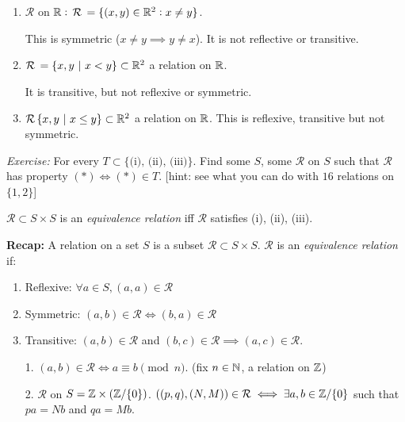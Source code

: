 \documentclass[10pt]{scrartcl}
\newcommand{\rel}{\mathcal{R}}
\begin{document}
\begin{examples}
	\begin{enumerate}
	\item $\rel$ on $\R: \,\rel\, = \{(x,y) \iR^2 : x \neq y\}$.
	
	This is symmetric ($x \neq y \implies y \neq x$). It is not reflective or transitive. 
	\item $\rel\, = \{x,y ~|~ x < y\} \subset \R^2$ a relation on $\mathbb{R}$. 	
	
	It is transitive, but not reflexive or symmetric. 
	
	\item $\rel\, \{x,y ~|~ x \leq y\} \subset \R^2$ a relation on $\mathbb{R}$. This is reflexive, transitive but not symmetric. 
	\end{enumerate}

\end{examples} 


\emph{Exercise:} For every $T \subset \{\text{(i), (ii), (iii)}\}$. Find some $S$, some $\rel$ on $S$ such that $\rel$ has property $(*) \iff (*) \in T$. [hint: see what you can do with $16$ relations on $\{1,2\}$]\\

\begin{definition}
$\rel \subset S \times S$ is an \emph{equivalence relation} iff $\rel$ satisfies (i), (ii), (iii).
\end{definition}

\pagebreak
\textbf{Recap:} A 
relation on a set $S$ is a subset $\rel \subset S\times S$. $\rel$ is an \emph{equivalence relation} if: 
\begin{enumerate}
\item Reflexive: $\forall a \in S, (a,a) \in \rel$
\item Symmetric: $(a,b) \in \rel \iff (b,a) \in \rel$
\item Transitive: $(a,b) \in \rel$ and $(b,c) \in \rel \implies (a,c) \in \rel$.
\end{enumerate}\vspace*{10pt}


\begin{examples}
\begin{enumerate}
	

\item[1.] $(a,b) \in \rel \iff a \equiv b \pmod{n}$. (fix $n \in \mathbb{N}$, a relation on $\mathbb{Z}$)


\item[2.] $\rel$ on $S = \mathbb{Z} \times (\mathbb{Z} /\{0\})$. $((p,q),(N,M)) \in \rel \iff \exists a,b \in \Z/\{0\}$ such that $pa = Nb$ and $qa = Mb$.
\end{enumerate}

\end{examples}\vspace*{5pt}
\end{document}

